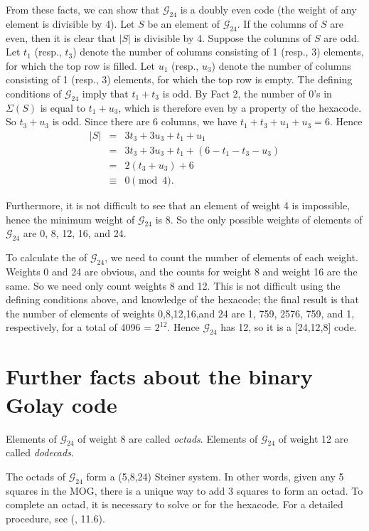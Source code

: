 \documentclass[12pt]{article}
\newcommand{\gc}{\mathcal{G}_{24}}
\begin{document}
From these facts, we can show that $\gc$ is a doubly even code (the weight of any element is divisible by 4).  Let $S$ be an element of $\gc$.  If the columns of $S$ are even, then it is clear that $|S|$ is divisible by 4.  Suppose the columns of $S$ are odd.  Let $t_1$ (resp., $t_3$) denote the number of columns consisting of 1 (resp., 3) elements, for which the top row is filled.  Let $u_1$ (resp., $u_3$) denote the number of columns consisting of 1 (resp., 3) elements, for which the top row is empty.  The defining conditions of $\gc$ imply that $t_1 + t_3$ is odd.  By Fact 2, the number of 0's in $\Sigma(S)$ is equal to $t_1 + u_3$, which is therefore even by a property of the hexacode.  So $t_3 + u_3$ is odd. Since there are 6 columns, we have $t_1 + t_3 + u_1 + u_3 = 6$.  Hence 
\begin{eqnarray*} 
|S|&     =  & 3t_3 + 3u_3 + t_1 + u_1 \\
   & = & 3t_3 + 3u_3 + t_1 + (6 - t_1 - t_3 - u_3)\\
   & = & 2(t_3 + u_3) + 6\\
   & \equiv & 0 \pmod{4}.
\end{eqnarray*}

Furthermore, it is not difficult to see that an element of weight 4 is impossible, hence the minimum weight of $\gc$ is 8.  So the only possible weights of elements of $\gc$ are 0, 8, 12, 16, and 24.

To calculate the  of $\gc$, we need to count the number of elements of each weight.  Weights 0 and 24 are obvious, and the counts for weight 8 and weight 16 are the same.  So we need only count weights 8 and 12.  This is not difficult using the defining conditions above, and knowledge of the hexacode; the final result is that the number of elements of weights 0,8,12,16,and 24 are 1, 759, 2576, 759, and 1, respectively, for a total of 4096 = $2^{12}$.  Hence $\gc$ has  12, so it is a [24,12,8] code.

\section{Further facts about the binary Golay code}

Elements of $\gc$ of weight 8 are called \emph{octads}.  Elements of $\gc$ of weight 12 are called \emph{dodecads}.

The octads of $\gc$ form a (5,8,24) Steiner system.  In other words, given any 5 squares in the MOG, there is a unique way to add 3 squares to form an octad.  To complete an octad, it is necessary to solve  or  for the hexacode.  For a detailed procedure, see (\cite{splag}, 11.6).
\end{document}
